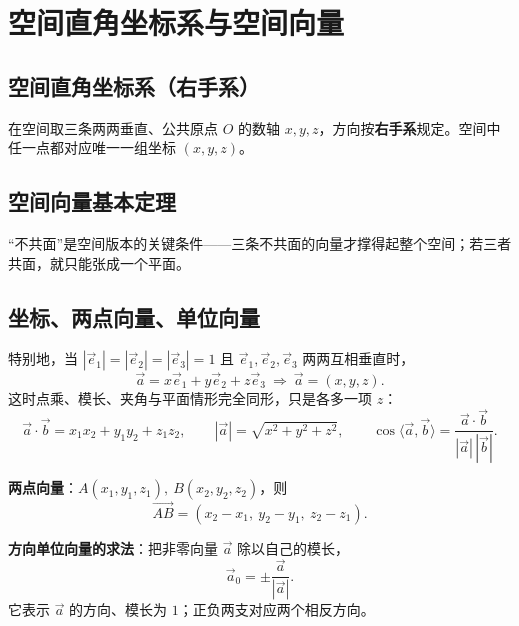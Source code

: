 \chapter{空间直角坐标系与空间向量}

\section{空间直角坐标系（右手系）}

在空间取三条两两垂直、公共原点 $O$ 的数轴 $x,y,z$，方向按\textbf{右手系}规定。空间中任一点都对应唯一一组坐标 $(x,y,z)$。

\begin{center}
\end{center}

\section{空间向量基本定理}


“不共面”是空间版本的关键条件——三条不共面的向量才撑得起整个空间；若三者共面，就只能张成一个平面。


\section{坐标、两点向量、单位向量}

特别地，当 $|\vec e_1|=|\vec e_2|=|\vec e_3|=1$ 且 $\vec e_1,\vec e_2,\vec e_3$ 两两互相垂直时，
\[
\vec a=x\vec e_1+y\vec e_2+z\vec e_3\ \Longrightarrow\ \vec a=(x,y,z).
\]
这时点乘、模长、夹角与平面情形完全同形，只是各多一项 $z$：
\[
\vec a\cdot\vec b=x_1x_2+y_1y_2+z_1z_2,\qquad |\vec a|=\sqrt{x^2+y^2+z^2},\qquad
\cos\langle\vec a,\vec b\rangle=\frac{\vec a\cdot\vec b}{|\vec a|\,|\vec b|}.
\]

\textbf{两点向量}：$A(x_1,y_1,z_1),\ B(x_2,y_2,z_2)$，则
\[
\vec{AB}=(x_2-x_1,\ y_2-y_1,\ z_2-z_1).
\]

\textbf{方向单位向量的求法}：把非零向量 $\vec a$ 除以自己的模长，
\[
\vec a_0=\pm\frac{\vec a}{|\vec a|}.
\]
它表示 $\vec a$ 的方向、模长为 $1$；正负两支对应两个相反方向。
